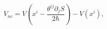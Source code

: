 \begin{equation}
V_{nc}=V\left(  x^{i}-\frac{\theta^{ij}\partial_{j}S}{2\hbar}\right)
-V\left(  x^{i}\right)  ,\label{40}%
\end{equation}%
